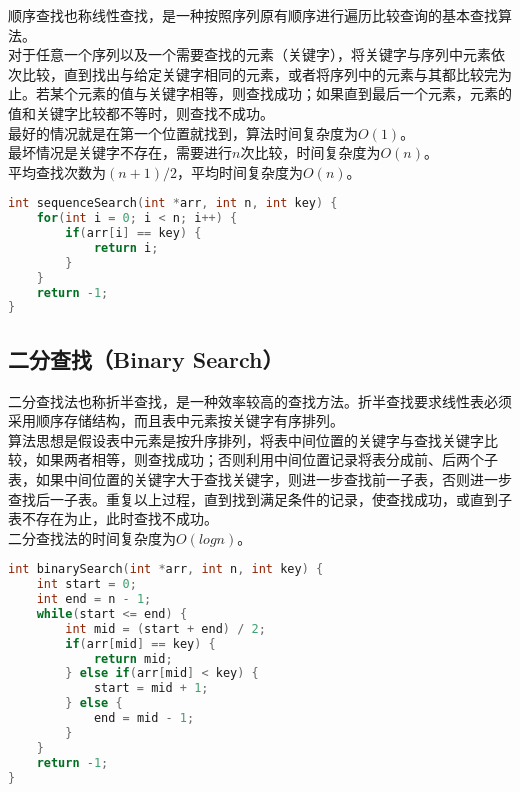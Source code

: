 顺序查找也称线性查找，是一种按照序列原有顺序进行遍历比较查询的基本查找算法。\\

对于任意一个序列以及一个需要查找的元素（关键字），将关键字与序列中元素依次比较，直到找出与给定关键字相同的元素，或者将序列中的元素与其都比较完为止。若某个元素的值与关键字相等，则查找成功；如果直到最后一个元素，元素的值和关键字比较都不等时，则查找不成功。\\

最好的情况就是在第一个位置就找到，算法时间复杂度为$ O(1) $。\\

最坏情况是关键字不存在，需要进行$ n $次比较，时间复杂度为$ O(n) $。\\

平均查找次数为$ (n + 1) / 2 $，平均时间复杂度为$ O(n) $。\\


\begin{lstlisting}[language=C]
int sequenceSearch(int *arr, int n, int key) {
    for(int i = 0; i < n; i++) {
        if(arr[i] == key) {
            return i;
        }
    }
    return -1;
}
\end{lstlisting}

\vspace{0.5cm}

\subsection{二分查找（Binary Search）}

二分查找法也称折半查找，是一种效率较高的查找方法。折半查找要求线性表必须采用顺序存储结构，而且表中元素按关键字有序排列。\\

算法思想是假设表中元素是按升序排列，将表中间位置的关键字与查找关键字比较，如果两者相等，则查找成功；否则利用中间位置记录将表分成前、后两个子表，如果中间位置的关键字大于查找关键字，则进一步查找前一子表，否则进一步查找后一子表。重复以上过程，直到找到满足条件的记录，使查找成功，或直到子表不存在为止，此时查找不成功。\\

二分查找法的时间复杂度为$ O(logn) $。\\


\begin{lstlisting}[language=C]
int binarySearch(int *arr, int n, int key) {
    int start = 0;
    int end = n - 1;
    while(start <= end) {
        int mid = (start + end) / 2;
        if(arr[mid] == key) {
            return mid;
        } else if(arr[mid] < key) {
            start = mid + 1;
        } else {
            end = mid - 1;
        }
    }
    return -1;
}
\end{lstlisting}

